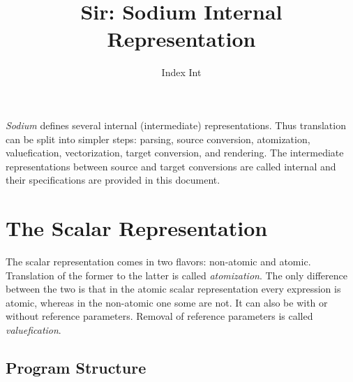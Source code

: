 \documentclass [a4paper] {article}
\title { Sir: Sodium Internal Representation }
\author { Index Int }
\begin{document}
\maketitle

\emph{Sodium} defines several internal (intermediate) representations. Thus
translation can be split into simpler steps: parsing, source conversion,
atomization, valuefication, vectorization, target conversion, and rendering. The
intermediate representations between source and target conversions are called
internal and their specifications are provided in this document.

\section { The Scalar Representation }

The scalar representation comes in two flavors: non-atomic and atomic.
Translation of the former to the latter is called \emph{atomization}. The only
difference between the two is that in the atomic scalar representation every
expression is atomic, whereas in the non-atomic one some are not. It can also be
with or without reference parameters. Removal of reference parameters is called
\emph{valuefication}.

\subsection { Program Structure }
\end{document}

